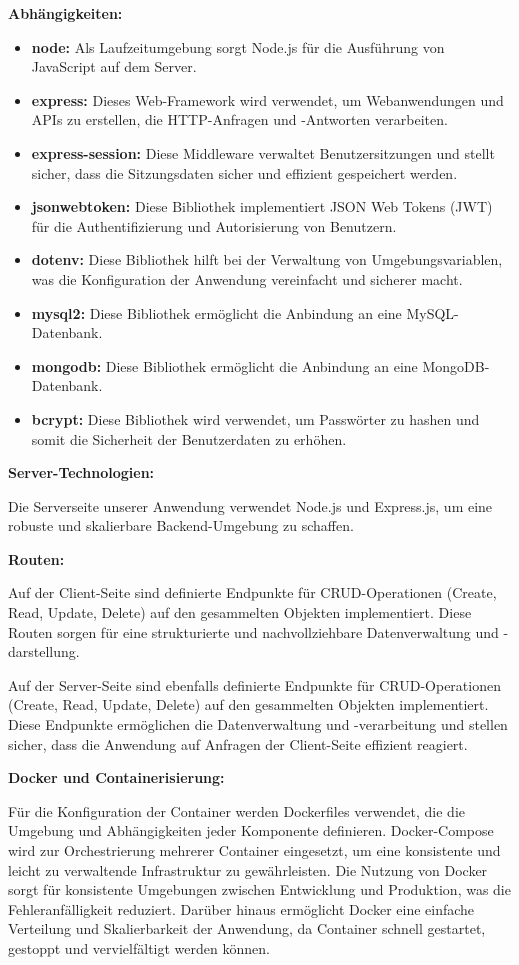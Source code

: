 \textbf{Abhängigkeiten:}
    \begin{itemize}
        \item \textbf{node:} Als Laufzeitumgebung sorgt Node.js für die Ausführung von JavaScript auf dem Server.
        \item \textbf{express:} Dieses Web-Framework wird verwendet, um Webanwendungen und APIs zu erstellen, die HTTP-Anfragen und -Antworten verarbeiten.
        \item \textbf{express-session:} Diese Middleware verwaltet Benutzersitzungen und stellt sicher, dass die Sitzungsdaten sicher und effizient gespeichert werden.
        \item \textbf{jsonwebtoken:} Diese Bibliothek implementiert JSON Web Tokens (JWT) für die Authentifizierung und Autorisierung von Benutzern.
        \item \textbf{dotenv:} Diese Bibliothek hilft bei der Verwaltung von Umgebungsvariablen, was die Konfiguration der Anwendung vereinfacht und sicherer macht.
        \item \textbf{mysql2:} Diese Bibliothek ermöglicht die Anbindung an eine MySQL-Datenbank.
        \item \textbf{mongodb:} Diese Bibliothek ermöglicht die Anbindung an eine MongoDB-Datenbank.
        \item \textbf{bcrypt:} Diese Bibliothek wird verwendet, um Passwörter zu hashen und somit die Sicherheit der Benutzerdaten zu erhöhen.
    \end{itemize}
\textbf{Server-Technologien:}

Die Serverseite unserer Anwendung verwendet Node.js und Express.js, um eine robuste und skalierbare Backend-Umgebung zu schaffen.

\textbf{Routen:}

Auf der Client-Seite sind definierte Endpunkte für CRUD-Operationen (Create, Read, Update, Delete) auf den gesammelten Objekten implementiert.
Diese Routen sorgen für eine strukturierte und nachvollziehbare Datenverwaltung und -darstellung.

Auf der Server-Seite sind ebenfalls definierte Endpunkte für CRUD-Operationen (Create, Read, Update, Delete) auf den gesammelten Objekten implementiert.
Diese Endpunkte ermöglichen die Datenverwaltung und -verarbeitung und stellen sicher, dass die Anwendung auf Anfragen der Client-Seite effizient reagiert.

\textbf{Docker und Containerisierung:}

Für die Konfiguration der Container werden Dockerfiles verwendet, die die Umgebung und Abhängigkeiten jeder Komponente definieren.
Docker-Compose wird zur Orchestrierung mehrerer Container eingesetzt, um eine konsistente und leicht zu verwaltende Infrastruktur zu gewährleisten.
Die Nutzung von Docker sorgt für konsistente Umgebungen zwischen Entwicklung und Produktion, was die Fehleranfälligkeit reduziert.
Darüber hinaus ermöglicht Docker eine einfache Verteilung und Skalierbarkeit der Anwendung, da Container schnell gestartet, gestoppt und vervielfältigt werden können.

